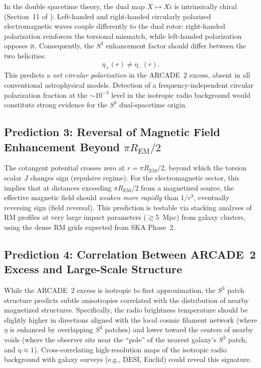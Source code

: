 \documentclass[a4paper]{article}
\begin{document}
In the double spacetime theory, the dual map $X \mapsto Xi$ is intrinsically
chiral (Section~11 of \cite{dst-main}). Left-handed and right-handed circularly
polarized electromagnetic waves couple differently to the dual rotor:
right-handed polarization reinforces the torsional mismatch, while left-handed
polarization opposes it. Consequently, the $S^3$ enhancement factor should
differ between the two helicities:
\[
\eta_+(r) \neq \eta_-(r).
\]
This predicts a \emph{net circular polarization} in the ARCADE~2 excess,
absent in all conventional astrophysical models. Detection of a
frequency-independent circular polarization fraction at the $\sim 10^{-3}$
level in the isotropic radio background would constitute strong evidence for the
$S^3$ dual-spacetime origin.

\subsection{Prediction 3: Reversal of Magnetic Field Enhancement Beyond $\pi R_{\text{EM}}/2$}

The cotangent potential crosses zero at $r = \pi R_{\text{EM}}/2$, beyond which
the torsion scalar $J$ changes sign (repulsive regime). For the electromagnetic
sector, this implies that at distances exceeding $\pi R_{\text{EM}}/2$ from a
magnetized source, the effective magnetic field should \emph{weaken more
rapidly} than $1/r^3$, eventually reversing sign (field reversal). This
prediction is testable via stacking analyses of RM profiles at very large impact
parameters ($\gtrsim 5$~Mpc) from galaxy clusters, using the dense RM grids
expected from SKA Phase~2.

\subsection{Prediction 4: Correlation Between ARCADE~2 Excess and Large-Scale Structure}

While the ARCADE~2 excess is isotropic to first approximation, the $S^3$ patch
structure predicts subtle anisotropies correlated with the distribution of
nearby magnetized structures. Specifically, the radio brightness temperature
should be slightly higher in directions aligned with the local cosmic filament
network (where $\eta$ is enhanced by overlapping $S^3$ patches) and lower toward
the centers of nearby voids (where the observer sits near the ``pole'' of the
nearest galaxy's $S^3$ patch, and $\eta \approx 1$). Cross-correlating
high-resolution maps of the isotropic radio background with galaxy surveys
(e.g., DESI, Euclid) could reveal this signature.
\end{document}
